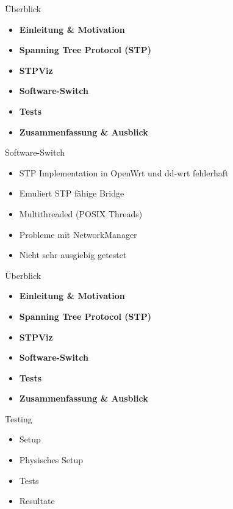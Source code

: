 \documentclass{beamer}
\begin{document}
\begin{frame}{Überblick}
    \begin{itemize}
        \item \textbf{Einleitung \& Motivation}
        \item \textbf{Spanning Tree Protocol (STP)}
        \item \textbf{STPViz}
        \item \alert{\textbf{Software-Switch}}
        \item \textbf{Tests}
        \item \textbf{Zusammenfassung \& Ausblick}
    \end{itemize}
\end{frame}

\begin{frame}{Software-Switch}
    \begin{itemize}[<+(1)->]
        \item STP Implementation in OpenWrt und dd-wrt fehlerhaft
        \item Emuliert STP fähige Bridge
        \item Multithreaded (POSIX Threads)
        \item \alert<7>{Probleme mit NetworkManager}
        \item Nicht sehr ausgiebig getestet
    \end{itemize}
\end{frame}

\begin{frame}{Überblick}
    \begin{itemize}
        \item \textbf{Einleitung \& Motivation}
        \item \textbf{Spanning Tree Protocol (STP)}
        \item \textbf{STPViz}
        \item \textbf{Software-Switch}
        \item \alert{\textbf{Tests}}
        \item \textbf{Zusammenfassung \& Ausblick}
    \end{itemize}
\end{frame}

\begin{frame}{Testing}
    \begin{itemize}
        \item Setup
        \item Physisches Setup
        \item Tests
        \item Resultate
    \end{itemize}
\end{frame}
\end{document}
